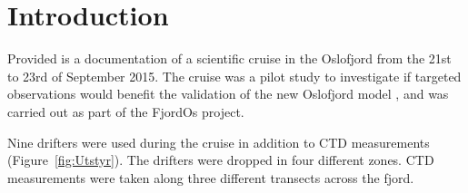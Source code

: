 \documentclass[12pt,a4paper,english]{article}
\begin{document}

\clearpage
\tableofcontents

\clearpage

\section{Introduction}
Provided is a documentation of a scientific cruise in the Oslofjord from the 21st to 23rd of September 2015. The cruise was a pilot study to investigate if targeted observations would benefit the validation of the new Oslofjord model \citep{roed:etal:2016}, and was carried out as part of the FjordOs project.


Nine drifters were used during the cruise in addition to CTD measurements (Figure~\ref{fig:Utstyr}). The drifters were dropped in four different zones. CTD measurements were taken along three different transects across the fjord. %
\end{document}
